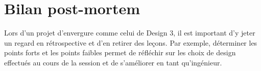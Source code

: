 \chapter{Bilan post-mortem}
 
Lors d'un projet d'envergure comme celui de Design 3, il est important d'y jeter un regard en rétrospective et d'en retirer des leçons. Par exemple, déterminer les points forts et les points faibles permet de réfléchir sur les choix de design effectués au cours de la session et de s'améliorer en tant qu'ingénieur.


